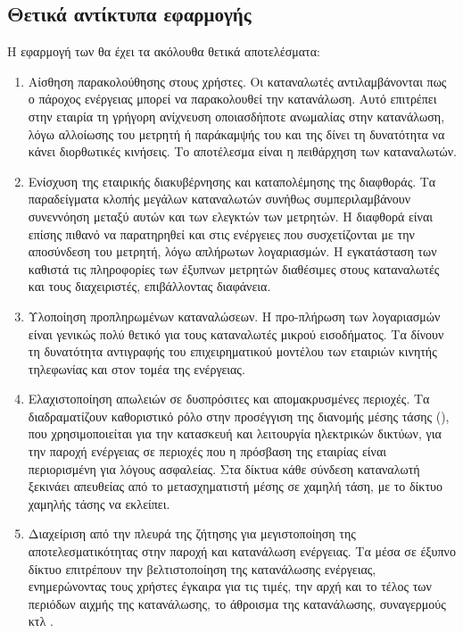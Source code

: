 \subsection{Θετικά αντίκτυπα εφαρμογής }
Η εφαρμογή των  θα έχει τα ακόλουθα θετικά αποτελέσματα:
\begin{enumerate}
\item Αίσθηση παρακολούθησης στους χρήστες. Οι καταναλωτές αντιλαμβάνονται πως ο πάροχος ενέργειας μπορεί να παρακολουθεί την κατανάλωση. Αυτό επιτρέπει στην εταιρία τη γρήγορη ανίχνευση οποιασδήποτε ανωμαλίας στην κατανάλωση, λόγω αλλοίωσης του μετρητή ή παράκαμψής του και της δίνει τη δυνατότητα να κάνει διορθωτικές κινήσεις. Το αποτέλεσμα είναι η πειθάρχηση των καταναλωτών.
\item Ενίσχυση της εταιρικής διακυβέρνησης και καταπολέμησης της διαφθοράς. Τα παραδείγματα κλοπής μεγάλων καταναλωτών συνήθως συμπεριλαμβάνουν συνεννόηση μεταξύ αυτών και των ελεγκτών των μετρητών. Η διαφθορά είναι επίσης πιθανό να παρατηρηθεί και στις ενέργειες που συσχετίζονται με την αποσύνδεση του μετρητή, λόγω απλήρωτων λογαριασμών. Η εγκατάσταση των  καθιστά τις πληροφορίες των έξυπνων μετρητών διαθέσιμες στους καταναλωτές και τους διαχειριστές, επιβάλλοντας διαφάνεια.
\item Υλοποίηση προπληρωμένων καταναλώσεων. Η προ-πλήρωση των λογαριασμών είναι γενικώς πολύ θετικό για τους καταναλωτές μικρού εισοδήματος. Τα  δίνουν τη δυνατότητα αντιγραφής του επιχειρηματικού μοντέλου των εταιριών κινητής τηλεφωνίας και στον τομέα της ενέργειας.
\item Ελαχιστοποίηση απωλειών σε δυσπρόσιτες και απομακρυσμένες περιοχές. Τα  διαδραματίζουν καθοριστικό ρόλο στην προσέγγιση της διανομής μέσης τάσης (), που χρησιμοποιείται για την κατασκευή και λειτουργία ηλεκτρικών δικτύων, για την παροχή ενέργειας σε περιοχές που η πρόσβαση της εταιρίας είναι περιορισμένη για λόγους ασφαλείας. Στα  δίκτυα κάθε σύνδεση καταναλωτή ξεκινάει απευθείας από το μετασχηματιστή μέσης σε χαμηλή τάση, με το δίκτυο χαμηλής τάσης να εκλείπει.
\item Διαχείριση από την πλευρά της ζήτησης για μεγιστοποίηση της αποτελεσματικότητας στην παροχή και κατανάλωση ενέργειας. Τα  μέσα σε έξυπνο δίκτυο επιτρέπουν την βελτιστοποίηση της κατανάλωσης ενέργειας, ενημερώνοντας τους χρήστες έγκαιρα για τις τιμές, την αρχή και το τέλος των περιόδων αιχμής της κατανάλωσης, το άθροισμα της κατανάλωσης, συναγερμούς κτλ \cite{reduceloss}.
\end{enumerate}
